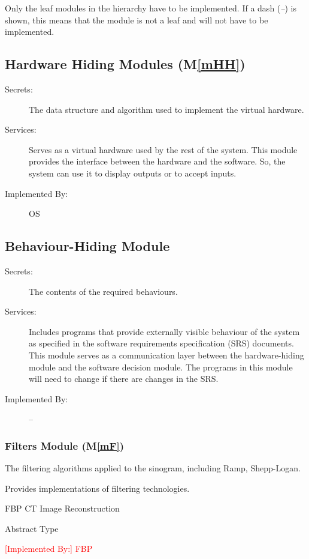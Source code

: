 \documentclass[12pt, titlepage]{article}
\newcommand{\mref}[1]{M\ref{#1}}
\newcommand{\add}{\textcolor{red}}
\begin{document}
Only the leaf modules in the hierarchy have to be implemented. If a dash
(\emph{--}) is shown, this means that the module is not a leaf and will not have
to be implemented.

\subsection{Hardware Hiding Modules (\mref{mHH})}

\begin{description}
\item[Secrets:]The data structure and algorithm used to implement the virtual
  hardware.
\item[Services:]Serves as a virtual hardware used by the rest of the
  system. This module provides the interface between the hardware and the
  software. So, the system can use it to display outputs or to accept inputs.
\item[Implemented By:] OS
\end{description}

\subsection{Behaviour-Hiding Module}

\begin{description}
\item[Secrets:]The contents of the required behaviours.
\item[Services:]Includes programs that provide externally visible behaviour of
  the system as specified in the software requirements specification (SRS)
  documents. This module serves as a communication layer between the
  hardware-hiding module and the software decision module. The programs in this
  module will need to change if there are changes in the SRS.
\item[Implemented By:] --
\end{description}

\subsubsection{Filters Module (\mref{mF})}

\begin{description}
\item[Secrets:] The filtering algorithms applied to the sinogram, including Ramp,
  Shepp-Logan.
\item[Services:] Provides implementations of filtering technologies.
\item[Implemented By:] FBP CT Image Reconstruction
\item[Type of Module:] Abstract Type
\item\add{[Implemented By:] FBP}
\end{description}
\end{document}
